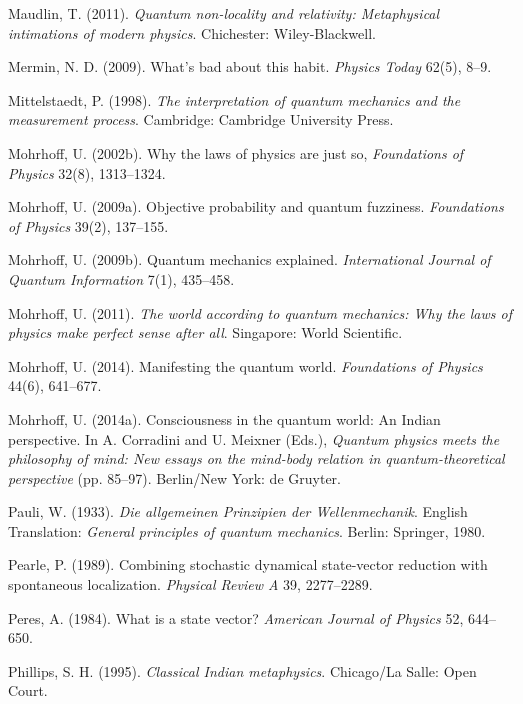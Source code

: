 \begin{thebibliography}{99}
Maudlin, T. (2011). \emph{Quantum non-locality and relativity: Metaphysical intimations of modern physics}. Chichester: Wiley-Blackwell. 

Mermin, N. D. (2009). What's bad about this habit. \emph{Physics Today} 62(5), 8--9. 

Mittelstaedt, P. (1998). \emph{The interpretation of quantum mechanics and the measurement process}. Cambridge: Cambridge University Press. 

Mohrhoff, U. (2002b). Why the laws of physics are just so, \emph{Foundations of Physics} 32(8), 1313--1324. 

Mohrhoff, U. (2009a). Objective probability and quantum fuzziness. \emph{Foundations of Physics} 39(2), 137--155. 

Mohrhoff, U. (2009b). Quantum mechanics explained. \emph{International Journal of Quantum Information} 7(1), 435--458. 

Mohrhoff, U. (2011). \emph{The world according to quantum mechanics: Why the laws of physics make perfect sense after all}. Singapore: World Scientific.

Mohrhoff, U. (2014). Manifesting the quantum world. \emph{Foundations of Physics} 44(6), 641--677. 

Mohrhoff, U. (2014a). Consciousness in the quantum world: An Indian perspective. In A. Corradini and U. Meixner (Eds.), \emph{Quantum physics meets the philosophy of mind: New essays on the mind-body relation in quantum-theoretical perspective} (pp. 85--97). Berlin/New York: de Gruyter. 

Pauli, W. (1933). \emph{Die allgemeinen Prinzipien der Wellenmechanik}. English Translation: \emph{General principles of quantum mechanics}. Berlin: Springer, 1980.

Pearle, P. (1989). Combining stochastic dynamical state-vector reduction
with spontaneous localization. \emph{Physical Review A} 39, 2277--2289.

Peres, A. (1984). What is a state vector? \emph{American Journal of Physics} 52, 644--650. 

Phillips, S. H. (1995). \emph{Classical Indian metaphysics}. Chicago/La Salle: Open Court. 


\end{thebibliography}
